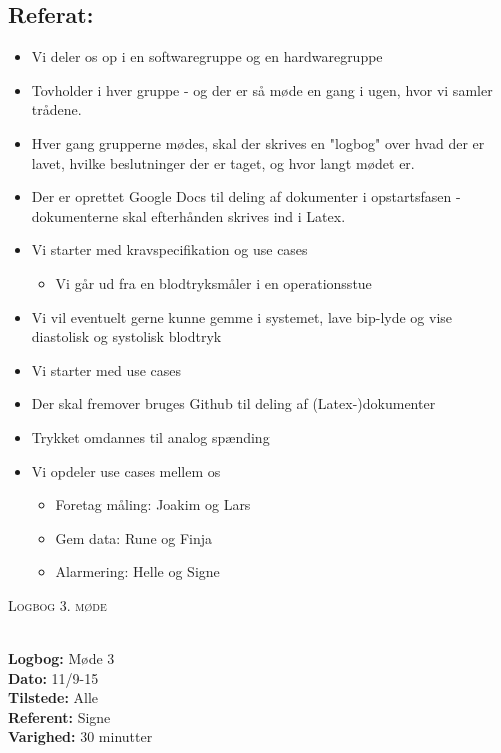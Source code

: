 \documentclass[a4paper,11pt,oneside]{memoir}
\begin{document}
\subsection{Referat:}

\begin{itemize}
\item Vi deler os op i en softwaregruppe og en hardwaregruppe
\end{itemize}
\begin{itemize}
\item Tovholder i hver gruppe - og der er så møde en gang i ugen, hvor vi samler trådene. 
\item Hver gang grupperne mødes, skal der skrives en "logbog" over hvad der er lavet, hvilke beslutninger der er taget, og hvor langt mødet er.
\item Der er oprettet Google Docs til deling af dokumenter i opstartsfasen - dokumenterne skal efterhånden skrives ind i Latex.
\item Vi starter med kravspecifikation og use cases
\begin{itemize}
\item Vi går ud fra en blodtryksmåler i en operationsstue
\end{itemize}
\item Vi vil eventuelt gerne kunne gemme i systemet, lave bip-lyde og vise diastolisk og systolisk blodtryk
\item Vi starter med use cases
\item Der skal fremover bruges Github til deling af (Latex-)dokumenter 
\item Trykket omdannes til analog spænding
\item Vi opdeler use cases mellem os
\begin{itemize}
\item Foretag måling: Joakim og Lars
\item Gem data: Rune og Finja
\item Alarmering: Helle og Signe
\end{itemize}
\end{itemize}
\newpage


\begin{center} 
\huge{\textsc{Logbog 3. møde}}
\end{center}

\textbf{ }
\\
\textbf{Logbog:} Møde 3
\\
\textbf{Dato:} 11/9-15
\\
\textbf{Tilstede:} Alle
\\
\textbf{Referent:} Signe
\\
\textbf{Varighed:} 30 minutter
\\
\end{document}
